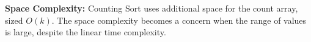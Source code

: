 \documentclass[preview]{standalone}
\begin{document}
\begin{center}
\textbf{Space Complexity:} Counting Sort uses additional space for the count array, sized $O(k)$. The space complexity becomes a concern when the range of values is large, despite the linear time complexity.
\end{center}
\end{document}
